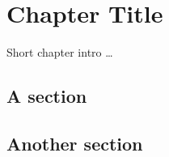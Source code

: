 \chapter{\label{cha:title}Chapter Title}

Short chapter intro \ldots

\section{A section}


\section{Another section}



